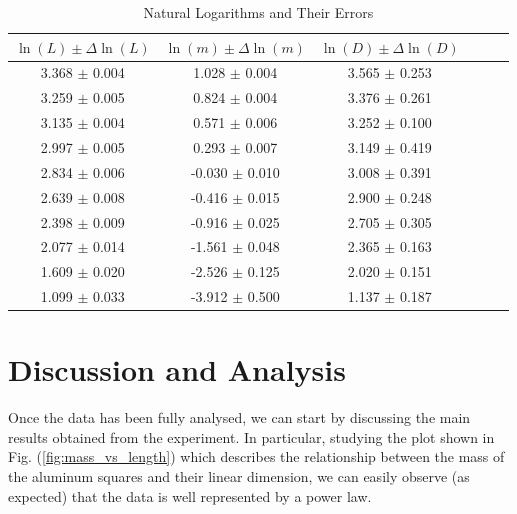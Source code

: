 \documentclass[a4paper,12pt]{article}
\begin{document}
\begin{table}[!ht]
    \centering
    \begin{tabular}{|c|c|c|c|c|c|}
    \hline
        \( \ln(L) \pm \Delta \ln(L) \) & \( \ln(m) \pm \Delta \ln(m) \) & \( \ln(D) \pm \Delta \ln(D) \) \\ \hline
        3.368 \(\pm\) 0.004 & 1.028 \(\pm\) 0.004 & 3.565 \(\pm\) 0.253 \\ \hline
        3.259 \(\pm\) 0.005 & 0.824 \(\pm\) 0.004 & 3.376 \(\pm\) 0.261 \\ \hline
        3.135 \(\pm\) 0.004 & 0.571 \(\pm\) 0.006 & 3.252 \(\pm\) 0.100 \\ \hline
        2.997 \(\pm\) 0.005 & 0.293 \(\pm\) 0.007 & 3.149 \(\pm\) 0.419 \\ \hline
        2.834 \(\pm\) 0.006 & -0.030 \(\pm\) 0.010 & 3.008 \(\pm\) 0.391 \\ \hline
        2.639 \(\pm\) 0.008 & -0.416 \(\pm\) 0.015 & 2.900 \(\pm\) 0.248 \\ \hline
        2.398 \(\pm\) 0.009 & -0.916 \(\pm\) 0.025 & 2.705 \(\pm\) 0.305 \\ \hline
        2.077 \(\pm\) 0.014 & -1.561 \(\pm\) 0.048 & 2.365 \(\pm\) 0.163 \\ \hline
        1.609 \(\pm\) 0.020 & -2.526 \(\pm\) 0.125 & 2.020 \(\pm\) 0.151 \\ \hline
        1.099 \(\pm\) 0.033 & -3.912 \(\pm\) 0.500 & 1.137 \(\pm\) 0.187 \\ \hline
    \end{tabular}
    \caption{Natural Logarithms and Their Errors}
    \label{tab:ln_errors}
\end{table}


\section{Discussion and Analysis}
\par Once the data has been fully analysed, we can start by discussing the main results obtained from the experiment. 
In particular, studying the plot shown in Fig. (\ref{fig:mass_vs_length}) which describes the relationship between the mass of the aluminum 
squares and their linear dimension, we can easily observe (as expected) that the data is well represented by a power law.
\end{document}
